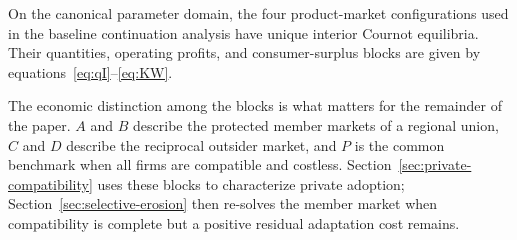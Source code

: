 \begin{lemma}
\label{lem:cournot-blocks}
On the canonical parameter domain, the four product-market configurations used in the baseline continuation analysis have unique interior Cournot equilibria. Their quantities, operating profits, and consumer-surplus blocks are given by equations~\eqref{eq:qI}--\eqref{eq:KW}.
\end{lemma}



The economic distinction among the blocks is what matters for the remainder of the paper. $A$ and $B$ describe the protected member markets of a regional union, $C$ and $D$ describe the reciprocal outsider market, and $P$ is the common benchmark when all firms are compatible and costless. Section~\ref{sec:private-compatibility} uses these blocks to characterize private adoption; Section~\ref{sec:selective-erosion} then re-solves the member market when compatibility is complete but a positive residual adaptation cost remains.
